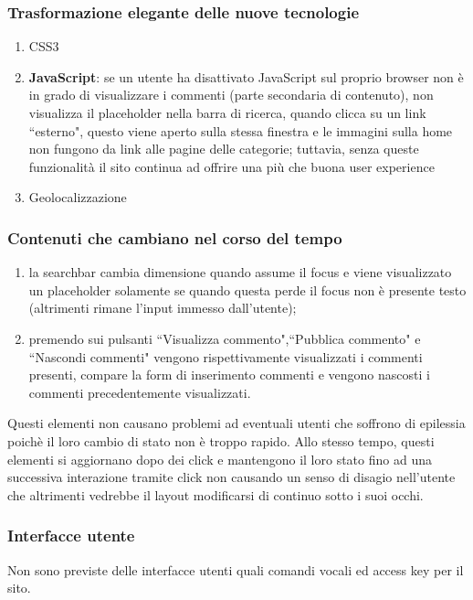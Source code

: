 \subsubsection{Trasformazione elegante delle nuove tecnologie}
\begin{enumerate}
\item CSS3%
\item \textbf{JavaScript}: se un utente ha disattivato JavaScript sul proprio
browser non è in grado di visualizzare i commenti (parte secondaria di contenuto), non visualizza il placeholder nella barra di ricerca, quando clicca su un link ``esterno", questo viene aperto sulla stessa finestra e le immagini sulla home non fungono da link alle pagine delle categorie; tuttavia, senza queste funzionalità il sito continua ad offrire una più che buona user experience
\item Geolocalizzazione %
\end{enumerate}

\subsubsection{Contenuti che cambiano nel corso del tempo}
\begin{enumerate}
\item la searchbar cambia dimensione quando assume il focus e viene
visualizzato un placeholder solamente se quando questa perde il focus non è
presente testo (altrimenti rimane l'input immesso dall'utente);
\item premendo sui pulsanti ``Visualizza commento",``Pubblica commento" e
``Nascondi commenti" vengono rispettivamente visualizzati i commenti presenti,
compare la form di inserimento commenti e vengono nascosti i commenti
precedentemente visualizzati.
\end{enumerate}

Questi elementi non causano problemi ad eventuali utenti che soffrono di
epilessia poichè il loro cambio di stato non è troppo rapido. Allo stesso
tempo, questi elementi si aggiornano dopo dei click e mantengono il loro stato
fino ad una successiva interazione tramite click non causando un senso di
disagio nell'utente che altrimenti vedrebbe il layout modificarsi di continuo
sotto i suoi occhi.

\subsubsection{Interfacce utente}
Non sono previste delle interfacce utenti quali comandi vocali ed access key
per il sito.

